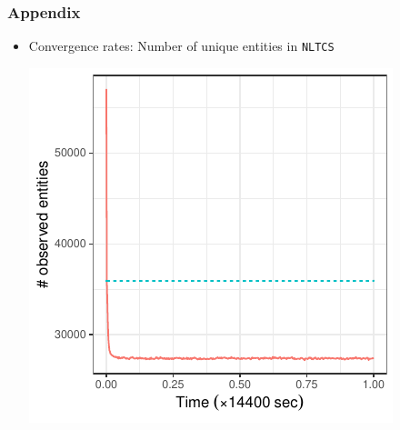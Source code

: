 \documentclass[9pt]{beamer}
\begin{document}
\begin{frame}
\frametitle{Appendix}

\begin{itemize}
\item Convergence rates: Number of unique entities in \texttt{NLTCS}
\begin{center}
  \includegraphics[width=\linewidth,height=0.8\textheight,keepaspectratio]{./figs/convergence-num-ent-blink-dblink-nltcs.pdf} 
\end{center}
\end{itemize}

\end{frame}
\end{document}
